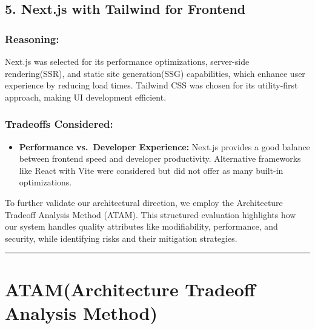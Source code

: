 \documentclass[
]{article}
\providecommand{\tightlist}{%
  \setlength{\itemsep}{0pt}\setlength{\parskip}{0pt}}
\begin{document}
\hypertarget{next.js-with-tailwind-for-frontend}{%
\subsection{5. Next.js with Tailwind for
Frontend}\label{next.js-with-tailwind-for-frontend}}

\hypertarget{reasoning-4}{%
\subsubsection{\texorpdfstring{\textbf{Reasoning:}}{Reasoning:}}\label{reasoning-4}}

Next.js was selected for its performance optimizations, server-side
rendering(SSR), and static site generation(SSG) capabilities, which
enhance user experience by reducing load times. Tailwind CSS was chosen
for its utility-first approach, making UI development efficient.

\hypertarget{tradeoffs-considered-4}{%
\subsubsection{\texorpdfstring{\textbf{Tradeoffs
Considered:}}{Tradeoffs Considered:}}\label{tradeoffs-considered-4}}

\begin{itemize}
\tightlist
\item
  \textbf{Performance vs.~Developer Experience:} Next.js provides a good
  balance between frontend speed and developer productivity. Alternative
  frameworks like React with Vite were considered but did not offer as
  many built-in optimizations.
\end{itemize}

To further validate our architectural direction, we employ the Architecture Tradeoff Analysis Method (ATAM). This structured evaluation highlights how our system handles quality attributes like modifiability, performance, and security, while identifying risks and their mitigation strategies.

\begin{center}\rule{0.5\linewidth}{0.5pt}\end{center}

\hypertarget{atamarchitecture-tradeoff-analysis-method}{%
\section{ATAM(Architecture Tradeoff Analysis
Method)}\label{atamarchitecture-tradeoff-analysis-method}}
\end{document}
